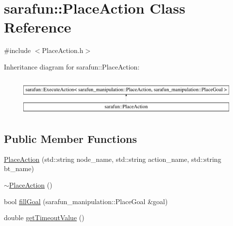 \hypertarget{classsarafun_1_1PlaceAction}{\section{sarafun\-:\-:Place\-Action Class Reference}
\label{classsarafun_1_1PlaceAction}
}


{\ttfamily \#include $<$Place\-Action.\-h$>$}

Inheritance diagram for sarafun\-:\-:Place\-Action\-:\begin{figure}[H]
\begin{center}
\leavevmode
\includegraphics[height=1.996435cm]{classsarafun_1_1PlaceAction}
\end{center}
\end{figure}
\subsection*{Public Member Functions}
\begin{DoxyCompactItemize}
\item 
\hyperlink{classsarafun_1_1PlaceAction_ad55f21266cf4807d831e2834fb6e5259}{Place\-Action} (std\-::string node\-\_\-name, std\-::string action\-\_\-name, std\-::string bt\-\_\-name)
\item 
\hyperlink{classsarafun_1_1PlaceAction_ae98d86339fdd0d275acff03c968ff834}{$\sim$\-Place\-Action} ()
\item 
bool \hyperlink{classsarafun_1_1PlaceAction_a7d48e758adf6cea93fa15409bafda8c8}{fill\-Goal} (sarafun\-\_\-manipulation\-::\-Place\-Goal \&goal)
\item 
double \hyperlink{classsarafun_1_1PlaceAction_a0b53372fd2de920c3ebd94c8c7f80b6a}{get\-Timeout\-Value} ()
\end{DoxyCompactItemize}


